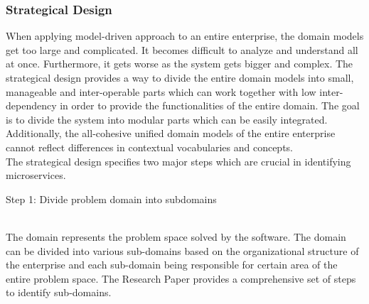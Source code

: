 \subsubsection{Strategical Design}\label{section:domain_driven_design/process_to_domain_driven_design/strategical_design}
When applying model-driven approach to an entire enterprise, the domain models get too large and complicated. It becomes difficult to analyze and understand all at once. Furthermore, it gets worse as the system gets bigger and complex. The strategical design provides a way to divide the entire domain models into small, manageable and inter-operable parts which can work together with low inter-dependency in order to provide the functionalities of the entire domain. The goal is to divide the system into modular parts which can be easily integrated. Additionally, the all-cohesive unified domain models of the entire enterprise cannot reflect differences in contextual vocabularies and concepts. \cite{Fowler:2014ab}\cite{Evans:2003aa}\cite{Vernon:2013aa}
\\
The strategical design specifies two major steps which are crucial in identifying microservices.
\\
\begin{shaded}Step 1: Divide problem domain into subdomains \end{shaded} \label{section:domain_driven_design/process_to_domain_driven_design/strategical_design/step_1}
\\
The domain represents the problem space solved by the software. The domain can be divided into various sub-domains based on the organizational structure of the enterprise and each sub-domain being responsible for certain area of the entire problem space. The Research Paper \cite{Engels:2015aa} provides a comprehensive set of steps to identify sub-domains.
